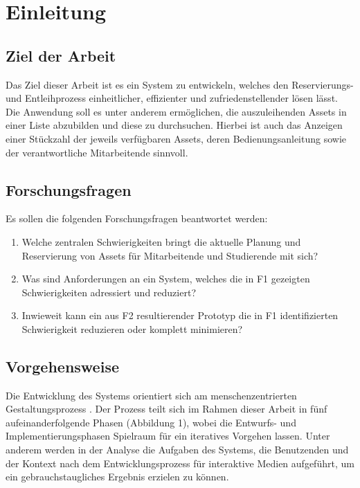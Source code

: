 
\chapter{Einleitung}


\section{Ziel der Arbeit}
Das Ziel dieser Arbeit ist es ein System zu entwickeln, welches den Reservierungs- und
Entleihprozess einheitlicher, effizienter und zufriedenstellender lösen lässt. Die Anwendung soll es
unter anderem ermöglichen, die auszuleihenden Assets in einer Liste abzubilden und diese zu
durchsuchen. Hierbei ist auch das Anzeigen einer Stückzahl der jeweils verfügbaren Assets, deren
Bedienungsanleitung sowie der verantwortliche Mitarbeitende sinnvoll.

\section{Forschungsfragen}
Es sollen die folgenden Forschungsfragen beantwortet werden:

\begin{enumerate}
  \item[\sffamily\color{maincolor} {F1}] {Welche zentralen Schwierigkeiten bringt die aktuelle Planung und Reservierung von Assets für Mitarbeitende und Studierende mit sich?}
  \item[\sffamily\color{maincolor} {F2}] {Was sind Anforderungen an ein System, welches die in F1 gezeigten Schwierigkeiten adressiert und reduziert?}
  \item[\sffamily\color{maincolor} {F3}] {Inwieweit kann ein aus F2 resultierender Prototyp die in F1 identifizierten Schwierigkeit reduzieren oder komplett minimieren?}
\end{enumerate}


\section{Vorgehensweise}
Die Entwicklung des Systems orientiert sich am menschenzentrierten Gestaltungsprozess
\cite{din_en_iso_9421-2102020-03_din_nodate}. Der Prozess teilt sich im Rahmen dieser Arbeit in
fünf aufeinanderfolgende Phasen (Abbildung 1), wobei die Entwurfs- und Implementierungsphasen
Spielraum für ein iteratives Vorgehen lassen. Unter anderem werden in der Analyse die Aufgaben des
Systems, die Benutzenden und der Kontext nach dem Entwicklungsprozess für interaktive Medien
\cite{herczeg_einfuhrung_2009} aufgeführt, um ein gebrauchstaugliches Ergebnis erzielen zu können.

